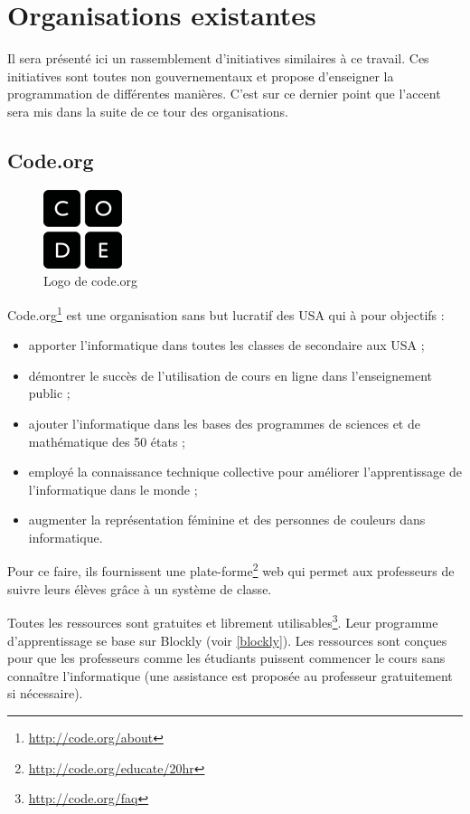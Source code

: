 \section{Organisations existantes}
Il sera présenté ici un rassemblement d'initiatives similaires à ce travail. Ces initiatives sont toutes non gouvernementaux et propose d'enseigner la programmation de différentes manières. C'est sur ce dernier point que l'accent sera mis dans la suite de ce tour des organisations.
\subsection{Code.org}
\begin{figure}[!h]
  \begin{center}
    \includegraphics[scale=0.5]{content/5-related_work/images/code}
    \caption{Logo de code.org}
    \label{fig:code.org}
  \end{center}
\end{figure}
Code.org\footnote{\url{http://code.org/about}} est une organisation sans but lucratif des USA qui à pour objectifs :
\begin{itemize}
  \item apporter l'informatique dans toutes les classes de secondaire aux USA ;
  \item démontrer le succès de l'utilisation de cours en ligne dans l'enseignement public ;
  \item ajouter l'informatique dans les bases des programmes de sciences et de mathématique des 50 états ;
  \item employé la connaissance technique collective pour améliorer l'apprentissage de l'informatique dans le monde ;
  \item augmenter la représentation féminine et des personnes de couleurs dans informatique.
\end{itemize}

Pour ce faire, ils fournissent une plate-forme\footnote{\url{http://code.org/educate/20hr}} web qui permet aux professeurs de suivre leurs élèves grâce à un système de classe.

Toutes les ressources sont gratuites et librement utilisables\footnote{\url{http://code.org/faq}}. Leur programme d'apprentissage se base sur Blockly (voir \ref{blockly}).
Les ressources sont conçues pour que les professeurs comme les étudiants puissent commencer le cours sans connaître l'informatique (une assistance est proposée au professeur gratuitement si nécessaire).

